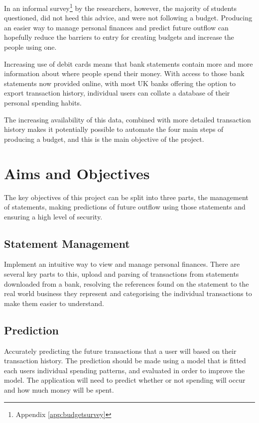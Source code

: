 In an informal survey\footnote{Appendix \ref{app:budgetsurvey}} by the researchers, however, the majority of students questioned, did not heed this advice, and were not following a budget. Producing an easier way to manage personal finances and predict future outflow can hopefully reduce the barriers to entry for creating budgets and increase the people using one.

Increasing use of debit cards \parencite{bbc2010debit} means that bank statements contain more and more information about where people spend their money. With access to those bank statements now provided online, with most UK banks offering the option to export \gls{transaction} history, individual users can collate a database of their personal spending habits.

The increasing availability of this data, combined with more detailed transaction history makes it potentially possible to automate the four main steps of producing a budget, and this is the main objective of the project.

\section{Aims and Objectives}
The key objectives of this project can be split into three parts, the management of statements, making predictions of future outflow using those statements and ensuring a high level of security.

\subsection{Statement Management}
Implement an intuitive way to view and manage personal finances.
%
There are several key parts to this, upload and parsing of transactions from statements downloaded from a bank, resolving the references found on the statement to the real world business they represent and categorising the individual transactions to make them easier to understand. 
    
\subsection{Prediction}
Accurately predicting the future transactions that a user will based on their transaction history.
%
The prediction should be made using a model that is fitted each users individual spending patterns, and evaluated in order to improve the model.
%
The application will need to predict whether or not spending will occur and how much money will be spent.

